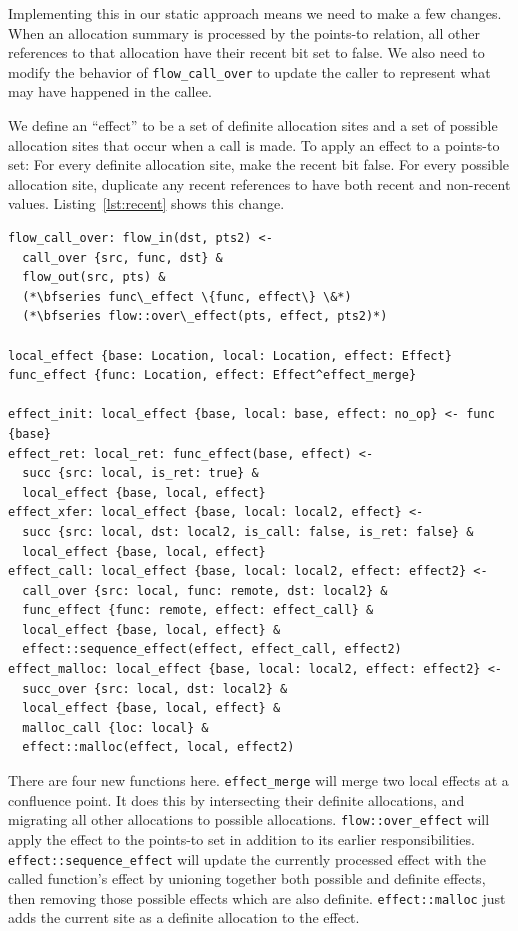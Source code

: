 Implementing this in our static approach means we need to make a few changes.
When an allocation summary is processed by the points-to relation, all other references to that allocation have their recent bit set to false.
We also need to modify the behavior of \texttt{flow\_call\_over} to update the caller to represent what may have happened in the callee.

We define an ``effect'' to be a set of definite allocation sites and a set of possible allocation sites that occur when a call is made.
To apply an effect to a points-to set:
For every definite allocation site, make the recent bit false.
For every possible allocation site, duplicate any recent references to
have both recent and non-recent values. Listing~\ref{lst:recent} shows
this change.

\begin{lstlisting}[float=*t, caption={Rules for Recent Domain}, label=lst:recent]
flow_call_over: flow_in(dst, pts2) <-
  call_over {src, func, dst} &
  flow_out(src, pts) &
  (*\bfseries func\_effect \{func, effect\} \&*)
  (*\bfseries flow::over\_effect(pts, effect, pts2)*)

local_effect {base: Location, local: Location, effect: Effect}
func_effect {func: Location, effect: Effect^effect_merge}

effect_init: local_effect {base, local: base, effect: no_op} <- func {base}
effect_ret: local_ret: func_effect(base, effect) <-
  succ {src: local, is_ret: true} &
  local_effect {base, local, effect}
effect_xfer: local_effect {base, local: local2, effect} <-
  succ {src: local, dst: local2, is_call: false, is_ret: false} &
  local_effect {base, local, effect}
effect_call: local_effect {base, local: local2, effect: effect2} <-
  call_over {src: local, func: remote, dst: local2} &
  func_effect {func: remote, effect: effect_call} &
  local_effect {base, local, effect} &
  effect::sequence_effect(effect, effect_call, effect2)
effect_malloc: local_effect {base, local: local2, effect: effect2} <-
  succ_over {src: local, dst: local2} &
  local_effect {base, local, effect} &
  malloc_call {loc: local} &
  effect::malloc(effect, local, effect2)
\end{lstlisting}

There are four new functions here.
\texttt{effect\_merge} will merge two local effects at a confluence point.
It does this by intersecting their definite allocations, and migrating all other allocations to possible allocations.
\texttt{flow::over\_effect} will apply the effect to the points-to set in addition to its earlier responsibilities.
\texttt{effect::sequence\_effect} will update the currently processed effect with the called function's effect by unioning together both possible and definite effects, then removing those possible effects which are also definite.
\texttt{effect::malloc} just adds the current site as a definite allocation to the effect.

